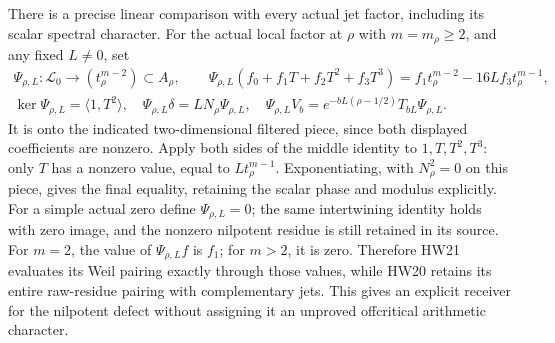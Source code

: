 \documentclass[11pt]{article}
\begin{document}
There is a precise linear comparison with every actual
jet factor, including its scalar spectral character.
For the actual local factor at \(\rho\) with \(m=m_\rho\ge2\),
and any fixed \(L\ne0\), set
\[
 \begin{gathered}
 \Psi_{\rho,L}:\mathscr L_0\longrightarrow
                 (t_\rho^{m-2})\subset A_\rho,\qquad
 \Psi_{\rho,L}(f_0+f_1T+f_2T^2+f_3T^3)
       =f_1t_\rho^{m-2}-16L f_3t_\rho^{m-1},\\
 \ker\Psi_{\rho,L}=\langle1,T^2\rangle,\quad
 \Psi_{\rho,L}\delta=L N_\rho\Psi_{\rho,L},\quad
 \Psi_{\rho,L}V_b=
   e^{-bL(\rho-1/2)}T_{bL}\Psi_{\rho,L}.
 \end{gathered}
 \tag{HW64}\label{hw:residuejet}
\]
It is onto the indicated two-dimensional filtered piece,
since both displayed coefficients are nonzero. Apply both
sides of the middle identity to \(1,T,T^2,T^3\): only
\(T\) has a nonzero value, equal to \(L t_\rho^{m-1}\).
Exponentiating, with \(N_\rho^2=0\) on this piece,
gives the final equality, retaining the scalar phase and
modulus explicitly. For a simple actual zero define
\(\Psi_{\rho,L}=0\); the same intertwining identity holds
with zero image, and the nonzero nilpotent residue is
still retained in its source.
For \(m=2\), the value of \(\Psi_{\rho,L}f\) is \(f_1\);
for \(m>2\), it is zero. Therefore HW21 evaluates its
Weil pairing exactly through those values, while HW20
retains its entire raw-residue pairing with complementary
jets. This gives an explicit receiver for the nilpotent
defect without assigning it an unproved offcritical
arithmetic character.
\end{document}
